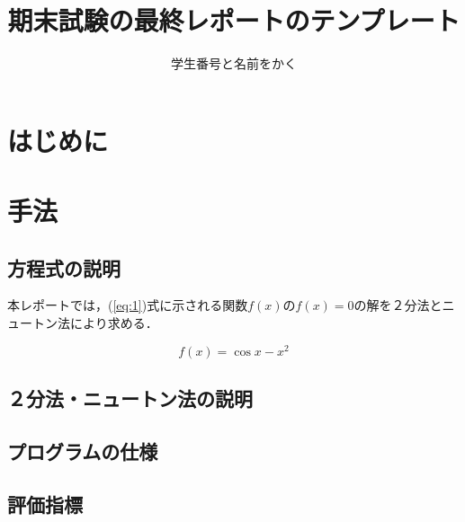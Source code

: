 \documentclass[uplatex]{jsarticle}
\begin{document}
\title{期末試験の最終レポートのテンプレート}
\author{学生番号と名前をかく}
\maketitle


\section{はじめに}

\section{手法}

\subsection{方程式の説明}

本レポートでは，(\ref{eq:1})式に示される関数$f(x)$の$f(x)=0$の解を２分法とニュートン法により求める．

\begin{equation}
f(x)=\cos x- x^2\label{eq:1}
\end{equation}

\subsection{２分法・ニュートン法の説明}

\subsection{プログラムの仕様}

\subsection{評価指標}
\end{document}
